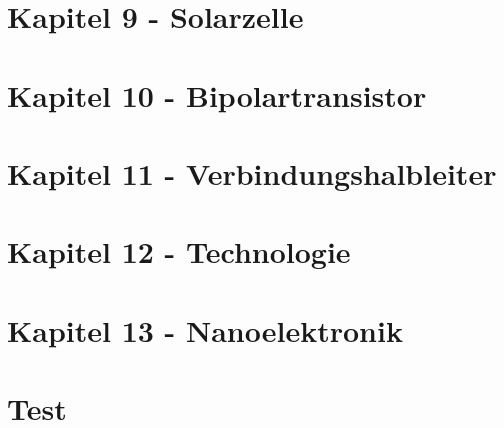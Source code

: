 	\section{Kapitel 9 - Solarzelle }
	
	
	\section{Kapitel 10 - Bipolartransistor }
	
	
	\section{Kapitel 11 - Verbindungshalbleiter }
	
	
	\section{Kapitel 12 - Technologie }
	
	
	\section{Kapitel 13 - Nanoelektronik }
	
	
	
	\section{Test}
	
	
	
	
	
	
	
	
